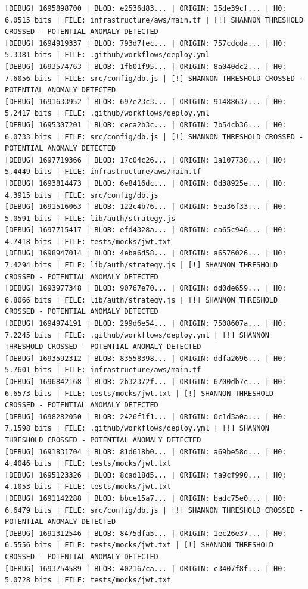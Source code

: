 \documentclass[12pt, a4paper, oneside]{report}
\begin{document}
\begin{lstlisting}[basicstyle=\tiny\ttfamily]
[DEBUG] 1695898700 | BLOB: e2536d83... | ORIGIN: 15de39cf... | H0: 6.0515 bits | FILE: infrastructure/aws/main.tf | [!] SHANNON THRESHOLD CROSSED - POTENTIAL ANOMALY DETECTED
[DEBUG] 1694919337 | BLOB: 793d7fec... | ORIGIN: 757cdcda... | H0: 5.3381 bits | FILE: .github/workflows/deploy.yml
[DEBUG] 1693574763 | BLOB: 1fb01f95... | ORIGIN: 8a040dc2... | H0: 7.6056 bits | FILE: src/config/db.js | [!] SHANNON THRESHOLD CROSSED - POTENTIAL ANOMALY DETECTED
[DEBUG] 1691633952 | BLOB: 697e23c3... | ORIGIN: 91488637... | H0: 5.2417 bits | FILE: .github/workflows/deploy.yml
[DEBUG] 1695307201 | BLOB: ceca2b3c... | ORIGIN: 7b54cb36... | H0: 6.0733 bits | FILE: src/config/db.js | [!] SHANNON THRESHOLD CROSSED - POTENTIAL ANOMALY DETECTED
[DEBUG] 1697719366 | BLOB: 17c04c26... | ORIGIN: 1a107730... | H0: 5.4449 bits | FILE: infrastructure/aws/main.tf
[DEBUG] 1693814473 | BLOB: 6e8416dc... | ORIGIN: 0d38925e... | H0: 4.3915 bits | FILE: src/config/db.js
[DEBUG] 1691516063 | BLOB: 122c4b76... | ORIGIN: 5ea36f33... | H0: 5.0591 bits | FILE: lib/auth/strategy.js
[DEBUG] 1697715417 | BLOB: efd4328a... | ORIGIN: ea65c946... | H0: 4.7418 bits | FILE: tests/mocks/jwt.txt
[DEBUG] 1698947014 | BLOB: 4eba6d58... | ORIGIN: a6576026... | H0: 7.4294 bits | FILE: lib/auth/strategy.js | [!] SHANNON THRESHOLD CROSSED - POTENTIAL ANOMALY DETECTED
[DEBUG] 1693977348 | BLOB: 90767e70... | ORIGIN: dd0de659... | H0: 6.8066 bits | FILE: lib/auth/strategy.js | [!] SHANNON THRESHOLD CROSSED - POTENTIAL ANOMALY DETECTED
[DEBUG] 1694974191 | BLOB: 299d6e54... | ORIGIN: 7508607a... | H0: 7.2245 bits | FILE: .github/workflows/deploy.yml | [!] SHANNON THRESHOLD CROSSED - POTENTIAL ANOMALY DETECTED
[DEBUG] 1693592312 | BLOB: 83558398... | ORIGIN: ddfa2696... | H0: 5.7601 bits | FILE: infrastructure/aws/main.tf
[DEBUG] 1696842168 | BLOB: 2b32372f... | ORIGIN: 6700db7c... | H0: 6.6573 bits | FILE: tests/mocks/jwt.txt | [!] SHANNON THRESHOLD CROSSED - POTENTIAL ANOMALY DETECTED
[DEBUG] 1698282050 | BLOB: 2426f1f1... | ORIGIN: 0c1d3a0a... | H0: 7.1598 bits | FILE: .github/workflows/deploy.yml | [!] SHANNON THRESHOLD CROSSED - POTENTIAL ANOMALY DETECTED
[DEBUG] 1691831704 | BLOB: 81d618b0... | ORIGIN: a69be58d... | H0: 4.4046 bits | FILE: tests/mocks/jwt.txt
[DEBUG] 1695123326 | BLOB: 8cad18d5... | ORIGIN: fa9cf990... | H0: 4.1053 bits | FILE: tests/mocks/jwt.txt
[DEBUG] 1691142288 | BLOB: bbce15a7... | ORIGIN: badc75e0... | H0: 6.6479 bits | FILE: src/config/db.js | [!] SHANNON THRESHOLD CROSSED - POTENTIAL ANOMALY DETECTED
[DEBUG] 1691312546 | BLOB: 8475dfa5... | ORIGIN: 1ec26e37... | H0: 6.5556 bits | FILE: tests/mocks/jwt.txt | [!] SHANNON THRESHOLD CROSSED - POTENTIAL ANOMALY DETECTED
[DEBUG] 1693754589 | BLOB: 402167ca... | ORIGIN: c3407f8f... | H0: 5.0728 bits | FILE: tests/mocks/jwt.txt
\end{lstlisting}
\end{document}
